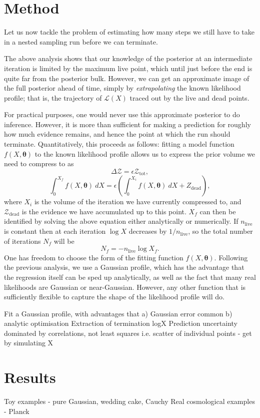 \documentclass[usenatbib]{mnras}
\newcommand{\thetab}{\bm{\theta}}
\newcommand{\nlive}{n_\mathrm{live}}
\newcommand{\Like}{\mathcal{L}}
\begin{document}
\section{Method}
Let us now tackle the problem of estimating how many steps we still have to take in a nested sampling run before we can terminate.
\par
The above analysis shows that our knowledge of the posterior at an intermediate iteration is limited by the maximum live point, which until just before the end is quite far from the posterior bulk. However, we can get an approximate image of the full posterior ahead of time, simply by \textit{extrapolating} the known likelihood profile; that is, the trajectory of $\Like(X)$ traced out by the live and dead points. 
\par
For practical purposes, one would never use this approximate posterior to do inference. However, it is more than sufficient for making a prediction for roughly how much evidence remains, and hence the point at which the run should terminate. Quantitatively, this proceeds as follows: fitting a model function $f(X, \thetab)$ to the known likelihood profile allows us to express the prior volume we need to compress to as 
\begin{equation}
	\Delta \mathcal{Z} = \epsilon \mathcal{Z}_\mathrm{tot},
\end{equation}
\begin{equation}\label{model endpoint}
	\int_0^{X_f} f(X, \thetab)\ dX = \epsilon \left( \int_0^{X_i} f(X, \thetab)\ dX + Z_\mathrm{dead} \right),
\end{equation}
where $X_i$ is the volume of the iteration we have currently compressed to, and $\mathcal{Z}_\mathrm{dead}$ is the evidence we have accumulated up to this point. $X_f$ can then be identified by solving the above equation either analytically or numerically. If $\nlive$ is constant then at each iteration $\log X$ decreases by $1/\nlive$, so the total number of iterations $N_f$ will be
\begin{equation}
	N_f = - \nlive \log X_f .
\end{equation}
One has freedom to choose the form of the fitting function $f(X, \thetab)$. Following the previous analysis, we use a Gaussian profile, which has the advantage that the regression itself can be sped up analytically, as well as the fact that many real likelihoods are Gaussian or near-Gaussian. However, any other function that is sufficiently flexible to capture the shape of the likelihood profile will do.

Fit a Gaussian profile, with advantages that a) Gaussian error common b) analytic optimisation 
Extraction of termination logX
Prediction uncertainty dominated by correlations, not least squares i.e. scatter of individual points - get by simulating X


\section{Results}
Toy examples - pure Gaussian,  wedding cake, Cauchy
Real cosmological examples - Planck
\end{document}
